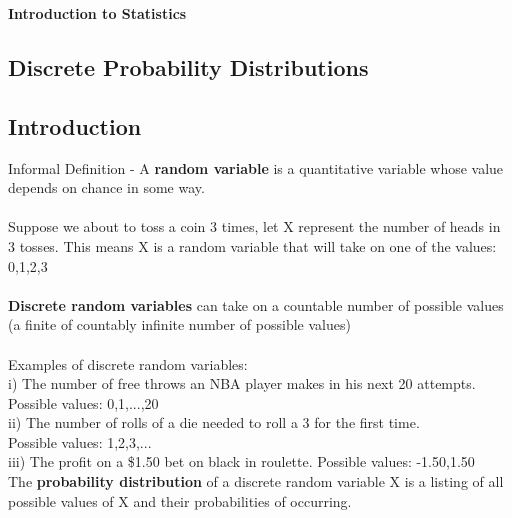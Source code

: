 \documentclass[12pt, a4paper]{article}
\begin{document}
	\begin{titlepage}
		\begin{center} \Huge \textbf{Introduction to Statistics} \end{center}
		\tableofcontents
		\newpage
	\end{titlepage}

\begin{center} \section{Discrete Probability Distributions} \end{center}
	\subsection{Introduction}
	Informal Definition - A \textbf{random variable} is a quantitative variable whose value depends on chance in some way. \\~\\
	Suppose we about to toss a coin 3 times, let X represent the number of heads in 3 tosses. This means X is a random variable that will take on one of the values: 0,1,2,3 \\~\\
	\textbf{Discrete random variables} can take on a countable number of possible values (a finite of countably infinite number of possible values)\\~\\
	Examples of discrete random variables: \\
	i) The number of free throws an NBA player makes in his next 20 attempts.\\ \hspace*{5mm} Possible values: 0,1,...,20 \\
	ii) The number of rolls of a die needed to roll a 3 for the first time.\\ \hspace*{5mm} Possible values: 1,2,3,...\\
	iii) The profit on a \$1.50 bet on black in roulette. Possible values: -1.50,1.50 \\
	
	\noindent The \textbf{probability distribution} of a discrete random variable X is a listing of all possible values of X and their probabilities of occurring. \\
	
\end{document}
